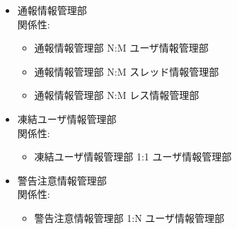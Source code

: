 \documentclass[a4j]{jarticle}
\begin{document}
\begin{itemize}
  \item 通報情報管理部\\
    関係性:
    
    \begin{itemize}
    \item 通報情報管理部 N:M ユーザ情報管理部
    \item 通報情報管理部 N:M スレッド情報管理部
    \item 通報情報管理部 N:M レス情報管理部
    \end{itemize}
  \item 凍結ユーザ情報管理部\\
    関係性:
    
    \begin{itemize}
    \item 凍結ユーザ情報管理部 1:1 ユーザ情報管理部
    \end{itemize}
    
   \item 警告注意情報管理部\\
    関係性:
    
    \begin{itemize}
    \item 警告注意情報管理部 1:N ユーザ情報管理部
    \end{itemize}   
    \end{itemize}
\appendix
\end{document}
